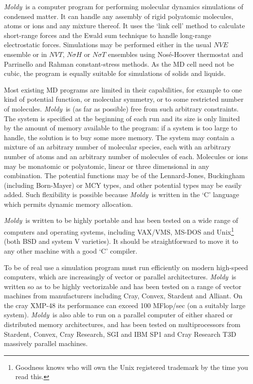 \documentclass[a4paper,twoside]{report}
\newcommand{\moldy}{\emph{Moldy}}
\begin{document}
\moldy\ is a computer program for performing molecular dynamics
simulations of condensed matter.  It can handle any assembly of rigid
polyatomic molecules, atoms or ions and any mixture thereof. It uses
the `link cell' method to calculate short-range forces and the Ewald
sum technique to handle long-range electrostatic forces.  Simulations
may be performed either in the usual $NVE$ ensemble or in $NVT$,
$N\sigma H$ or $N\sigma T$ ensembles using Nos{\'e}-Hoover thermostat and
Parrinello and Rahman constant-stress methods. As the MD cell need not
be cubic, the program is equally suitable for simulations of solids
and liquids.

Most existing MD programs are limited in their capabilities, for
example to one kind of potential function, or molecular symmetry, or
to some restricted number of molecules.  \moldy\  is (as far as
possible) free from such arbitrary constraints.  The system is
specified at the beginning of each run and its size is only limited by
the amount of memory available to the program: if a system is too
large to handle, the solution is to buy some more memory.  The system
may contain a mixture of an arbitrary number of molecular species,
each with an arbitrary number of atoms and an arbitrary number of
molecules of each. Molecules or ions may be monatomic or polyatomic,
linear or three dimensional in any combination.  The potential
functions may be of the Lennard-Jones, Buckingham (including
Born-Mayer) or MCY types, and other potential types may be easily
added.  Such flexibility is possible because \moldy\  is written in the
`C' language which permits dynamic memory allocation.

\moldy\  is written to be highly portable and has been tested on a wide
range of computers and operating systems, including VAX/VMS,
MS-DOS and Unix\footnote{Goodness knows who will own the Unix
registered trademark by the time you read this.}  (both BSD and system V
varieties).  It should be straightforward to move it to any other
machine with a good `C' compiler.

To be of real use a simulation  program must run efficiently on modern
high-speed computers, which  are  increasingly of vector   or parallel
architectures.  \moldy\  is written so  as to be highly vectorizable and
has been  tested on a   range of  vector machines  from  manufacturers
including Cray, Convex, Stardent and  Alliant.  On the cray XMP-48 its
performance can exceed 100 MFlop/sec (on a suitably large  system).
\moldy\ is also able to run on a parallel computer of either shared or
distributed memory architectures, and has been tested on
multiprocessors from Stardent, Convex, Cray Research, SGI and IBM SP1
and Cray Research T3D massively parallel machines.
\end{document}
